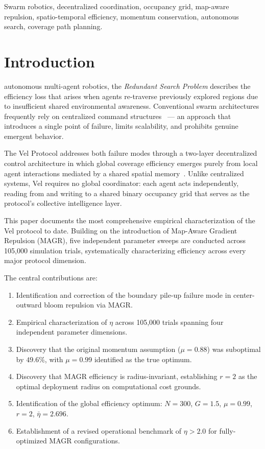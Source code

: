 \documentclass[journal,compsoc]{IEEEtran}
\begin{document}
\begin{IEEEkeywords}
Swarm robotics, decentralized coordination, occupancy grid, map-aware repulsion,
spatio-temporal efficiency, momentum conservation, autonomous search, coverage path planning.
\end{IEEEkeywords}

\section{Introduction}
\label{sec:intro}

 autonomous multi-agent robotics, the \textit{Redundant Search
Problem} describes the efficiency loss that arises when agents re-traverse previously
explored regions due to insufficient shared environmental awareness. Conventional swarm
architectures frequently rely on centralized command
structures~\cite{dorigo2004,brambilla2013,jamshidpey2024} --- an approach that introduces
a single point of failure, limits scalability, and prohibits genuine emergent behavior.

The Vel Protocol addresses both failure modes through a two-layer decentralized control
architecture in which global coverage efficiency emerges purely from local agent
interactions mediated by a shared spatial memory~\cite{reynolds1987}. Unlike centralized
systems, Vel requires no global coordinator: each agent acts independently, reading from
and writing to a shared binary occupancy grid that serves as the protocol's collective
intelligence layer.

This paper documents the most comprehensive empirical characterization of the Vel protocol
to date. Building on the introduction of Map-Aware Gradient Repulsion (MAGR), five
independent parameter sweeps are conducted across 105{,}000 simulation trials,
systematically characterizing efficiency across every major protocol dimension.

The central contributions are:
\begin{enumerate}
    \item Identification and correction of the boundary pile-up failure mode in
          center-outward bloom repulsion via MAGR.
    \item Empirical characterization of $\eta$ across 105{,}000 trials spanning
          four independent parameter dimensions.
    \item Discovery that the original momentum assumption ($\mu=0.88$) was
          suboptimal by $49.6\%$, with $\mu=0.99$ identified as the true optimum.
    \item Discovery that MAGR efficiency is radius-invariant, establishing $r=2$
          as the optimal deployment radius on computational cost grounds.
    \item Identification of the global efficiency optimum:
          $N=300$, $G=1.5$, $\mu=0.99$, $r=2$, $\bar{\eta}=2.696$.
    \item Establishment of a revised operational benchmark of $\eta>2.0$ for
          fully-optimized MAGR configurations.
\end{enumerate}
\end{document}
